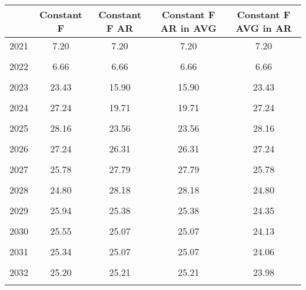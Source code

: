 \begin{tabular}{l*{4}{c}}
\hline\hline
                &Constant F&Constant F AR&Constant F AR in AVG&Constant F AVG in AR\\
\hline
2021            &     7.20&     7.20&     7.20&     7.20\\
                &         &         &         &         \\
2022            &     6.66&     6.66&     6.66&     6.66\\
                &         &         &         &         \\
2023            &    23.43&    15.90&    15.90&    23.43\\
                &         &         &         &         \\
2024            &    27.24&    19.71&    19.71&    27.24\\
                &         &         &         &         \\
2025            &    28.16&    23.56&    23.56&    28.16\\
                &         &         &         &         \\
2026            &    27.24&    26.31&    26.31&    27.24\\
                &         &         &         &         \\
2027            &    25.78&    27.79&    27.79&    25.78\\
                &         &         &         &         \\
2028            &    24.80&    28.18&    28.18&    24.80\\
                &         &         &         &         \\
2029            &    25.94&    25.38&    25.38&    24.35\\
                &         &         &         &         \\
2030            &    25.55&    25.07&    25.07&    24.13\\
                &         &         &         &         \\
2031            &    25.34&    25.07&    25.07&    24.06\\
                &         &         &         &         \\
2032            &    25.20&    25.21&    25.21&    23.98\\
                &         &         &         &         \\
\hline\hline
\end{tabular}
